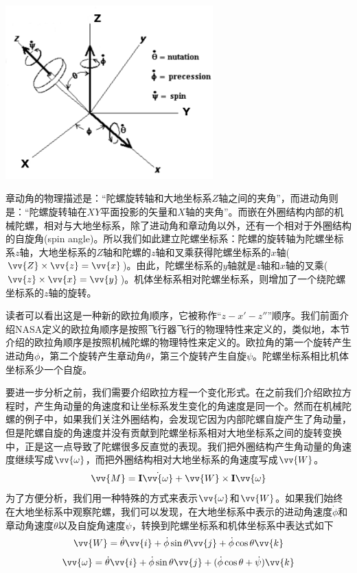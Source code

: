 \documentclass[11pt]{article}
\begin{document}
\begin{center}
\includegraphics[width=0.6\textwidth]{images/gyroframe1.png}
\end{center}

章动角的物理描述是：“陀螺旋转轴和大地坐标系$Z$轴之间的夹角”，而进动角则是：“陀螺旋转轴在$XY$平面投影的矢量和$X$轴的夹角”。而嵌在外圈结构内部的机械陀螺，相对与大地坐标系，除了进动角和章动角以外，还有一个相对于外圈结构的自旋角(spin angle)。所以我们如此建立陀螺坐标系：陀螺的旋转轴为陀螺坐标系$z$轴，大地坐标系的$Z$轴和陀螺的$z$轴和叉乘获得陀螺坐标系的$x$轴($\vv{Z} \times \vv{z} = \vv{x}$)。由此，陀螺坐标系的$y$轴就是$z$轴和$x$轴的叉乘($\vv{z} \times \vv{x} = \vv{y}$)。机体坐标系相对陀螺坐标系，则增加了一个绕陀螺坐标系的$z$轴的旋转。

读者可以看出这是一种新的欧拉角顺序，它被称作“$z-x'-z''$”顺序。我们前面介绍NASA定义的欧拉角顺序是按照飞行器飞行的物理特性来定义的，类似地，本节介绍的欧拉角顺序是按照机械陀螺的物理特性来定义的。欧拉角的第一个旋转产生进动角$\phi$，第二个旋转产生章动角$\theta$，第三个旋转产生自旋$\psi$。陀螺坐标系相比机体坐标系少一个自旋。

要进一步分析之前，我们需要介绍欧拉方程一个变化形式。在之前我们介绍欧拉方程时，产生角动量的角速度和让坐标系发生变化的角速度是同一个。然而在机械陀螺的例子中，如果我们关注外圈结构，会发现它因为内部陀螺自旋产生了角动量，但是陀螺自旋的角速度并没有贡献到陀螺坐标系相对大地坐标系之间的旋转变换中，正是这一点导致了陀螺很多反直觉的表现。我们把外圈结构产生角动量的角速度继续写成$\vv{\omega}$，而把外圈结构相对大地坐标系的角速度写成$\vv{W}$。
\begin{equation}\label{eqn:modifyeuler}
\vv{M} = {\bf I}\dot{\vv{\omega}} + \vv{W} \times {\bf I}\vv{\omega}
\end{equation}
为了方便分析，我们用一种特殊的方式来表示$\vv{\omega}$和$\vv{W}$。如果我们始终在大地坐标系中观察陀螺，我们可以发现，在大地坐标系中表示的进动角速度$\dot{\phi}$和章动角速度$\dot{\theta}$以及自旋角速度$\dot{\psi}$，转换到陀螺坐标系和机体坐标系中表达式如下
\begin{equation}\label{eqn:gryoW}
\vv{W} = \dot{\theta} \vv{i} + \dot{\phi}\sin\theta \vv{j} + \dot{\phi}\cos\theta \vv{k}
\end{equation}
\begin{equation}\label{eqn:gyroomega}
\vv{\omega} = \dot{\theta} \vv{i} + \dot{\phi}\sin\theta \vv{j} + (\dot{\phi}\cos\theta+\dot{\psi}) \vv{k}
\end{equation}
\end{document}
